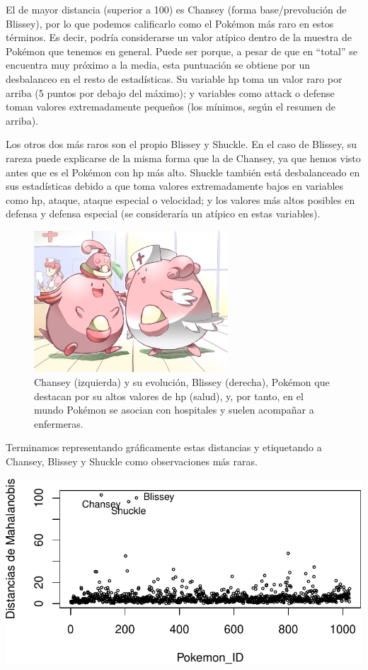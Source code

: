 \documentclass[
  12pt,
]{extreport}
\begin{document}
El de mayor distancia (superior a 100) es Chansey (forma
base/prevolución de Blissey), por lo que podemos calificarlo como el
Pokémon más raro en estos términos. Es decir, podría considerarse un
valor atípico dentro de la muestra de Pokémon que tenemos en general.
Puede ser porque, a pesar de que en ``total'' se encuentra muy próximo a
la media, esta puntuación se obtiene por un desbalanceo en el resto de
estadísticas. Su variable hp toma un valor raro por arriba (5 puntos por
debajo del máximo); y variables como attack o defense toman valores
extremadamente pequeños (los mínimos, según el resumen de arriba).

Los otros dos más raros son el propio Blissey y Shuckle. En el caso de
Blissey, su rareza puede explicarse de la misma forma que la de Chansey,
ya que hemos visto antes que es el Pokémon con hp más alto. Shuckle
también está desbalanceado en sus estadísticas debido a que toma valores
extremadamente bajos en variables como hp, ataque, ataque especial o
velocidad; y los valores más altos posibles en defensa y defensa
especial (se consideraría un atípico en estas variables).

\begin{figure}[H]

{\centering \includegraphics[width=2.85417in,height=\textheight]{trabajo_images/chansey_blissey.jpg}

}

\caption{Chansey (izquierda) y su evolución, Blissey (derecha), Pokémon
que destacan por su altos valores de hp (salud), y, por tanto, en el
mundo Pokémon se asocian con hospitales y suelen acompañar a
enfermeras.}

\end{figure}%

Terminamos representando gráficamente estas distancias y etiquetando a
Chansey, Blissey y Shuckle como observaciones más raras.

\begin{center}
\includegraphics{trabajo_files/figure-pdf/unnamed-chunk-15-1.pdf}
\end{center}
\end{document}
